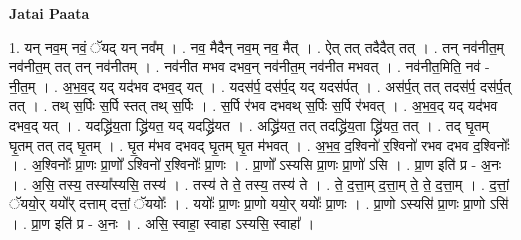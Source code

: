 \documentclass[17pt]{extarticle}
\begin{document}
\textbf{Jatai Paata} \newline

1. यन् नव॒म् नवं॒ ॅयद् यन् नव᳚म् । . नव॒ मैदैन् नव॒म् नव॒ मैत् । . ऐत् तत् तदैदैत् तत् । . तन् नव॑नीत॒म् नव॑नीत॒म् तत् तन् नव॑नीतम् । . नव॑नीत मभव दभव॒न् नव॑नीत॒म् नव॑नीत मभवत् । . नव॑नीत॒मिति॒ नव॑ - नी॒त॒म् । . अ॒भ॒व॒द् यद् यद॑भव दभव॒द् यत् । . यदस॑र्प॒ दस॑र्प॒द् यद् यदस॑र्पत् । . अस॑र्प॒त् तत् तदस॑र्प॒ दस॑र्प॒त् तत् । . तथ् स॒र्पिः स॒र्पि स्तत् तथ् स॒र्पिः । . स॒र्पि र॑भव दभवथ् स॒र्पिः स॒र्पि र॑भवत् । . अ॒भ॒व॒द् यद् यद॑भव दभव॒द् यत् । . यदद्ध्रि॑य॒ता द्ध्रि॑यत॒ यद् यदद्ध्रि॑यत । . अद्ध्रि॑यत॒ तत् तदद्ध्रि॑य॒ता द्ध्रि॑यत॒ तत् । . तद् घृ॒तम् घृ॒तम् तत् तद् घृ॒तम् । . घृ॒त म॑भव दभवद् घृ॒तम् घृ॒त म॑भवत् । . अ॒भ॒व॒ द॒श्विनो॑ र॒श्विनो॑ रभव दभव द॒श्विनोः᳚ । . अ॒श्विनोः᳚ प्रा॒णः प्रा॒णो᳚ ऽश्विनो॑ र॒श्विनोः᳚ प्रा॒णः । . प्रा॒णो᳚ ऽस्यसि प्रा॒णः प्रा॒णो॑ ऽसि । . प्रा॒ण इति॑ प्र - अ॒नः । . अ॒सि॒ तस्य॒ तस्या᳚स्यसि॒ तस्य॑ । . तस्य॑ ते ते॒ तस्य॒ तस्य॑ ते । . ते॒ द॒त्ता॒म् द॒त्ता॒म् ते॒ ते॒ द॒त्ता॒म् । . द॒त्तां॒ ॅययो॒र् ययो᳚र् दत्ताम् दत्तां॒ ॅययोः᳚ । . ययोः᳚ प्रा॒णः प्रा॒णो ययो॒र् ययोः᳚ प्रा॒णः । . प्रा॒णो ऽस्यसि॑ प्रा॒णः प्रा॒णो ऽसि॑ । . प्रा॒ण इति॑ प्र - अ॒नः । . असि॒ स्वाहा॒ स्वाहा ऽस्यसि॒ स्वाहा᳚ । \newline
\end{document}
